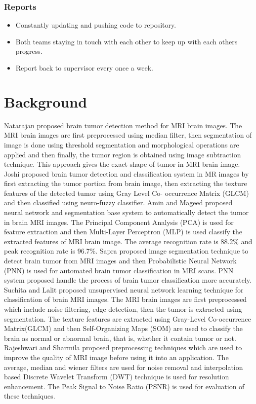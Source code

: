 \documentclass[11pt]{article}
\begin{document}
	\subsubsection[reports]{Reports}
	\begin{itemize}
		\item Constantly updating and pushing code to repository.
		\item Both teams staying in touch with each other to keep up with each
			others progress.
		\item Report back to supervisor every once a week.
	\end{itemize}

	\section[background]{Background}

	Natarajan \cite{bac1} proposed brain tumor detection method for MRI brain
	images. The MRI brain images are first preprocessed using median filter,
	then segmentation of image is done using threshold segmentation and
	morphological operations are applied and then finally, the tumor region is
	obtained using image subtraction technique. This approach gives the exact
	shape of tumor in MRI brain image. Joshi \cite{bac2}  proposed brain tumor
	detection and classification system in MR images by first extracting the
	tumor portion from brain image, then extracting the texture features of the
	detected tumor using Gray Level Co- occurrence Matrix (GLCM) and then
	classified using neuro-fuzzy classifier. Amin and Mageed \cite{bac3}
	proposed neural network and segmentation base system to automatically detect
	the tumor in brain MRI images. The Principal Component Analysis (PCA) is
	used for feature extraction and then Multi-Layer Perceptron (MLP) is used
	classify the extracted features of MRI brain image.  The average recognition
	rate is 88.2\% and peak recognition rate is 96.7\%.  Sapra \cite{bac4}
	proposed image segmentation technique to detect brain tumor from MRI images
	and then Probabilistic Neural Network (PNN)  is used for automated brain
	tumor classification in MRI scans. PNN system proposed handle the process of
	brain tumor classification more accurately. Suchita and Lalit \cite{bac5}
	proposed unsupervised neural network learning technique for classification
	of brain MRI images.  The MRI brain images are first preprocessed which
	include noise filtering, edge detection, then the tumor is extracted using
	segmentation. The texture features are extracted using Gray-Level
	Co-occurrence Matrix(GLCM) and then Self-Organizing Maps (SOM) are used to
	classify the brain as normal or abnormal brain, that is, whether it contain
	tumor or not. Rajeshwari and Sharmila \cite{bac6} proposed preprocessing
	techniques which are used to improve the quality of MRI image before using
	it into an application. The average, median and wiener filters are used for
	noise removal and interpolation based Discrete Wavelet Transform (DWT)
	technique is used for resolution enhancement. The Peak Signal to Noise Ratio
	(PSNR) is used for evaluation of these techniques.
\end{document}
